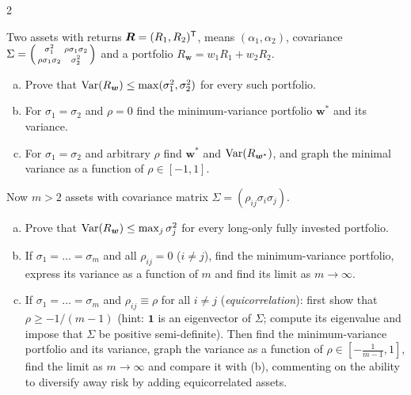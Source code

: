 \begin{paracol}{2}
\begin{exercise}\label{ch10:ex-ps6-3}
Two assets with returns $\bm R=(R_1,R_2)^{\mathsf T}$, means $(\alpha_1,\alpha_2)$, covariance
$\Sigma=\begin{psmallmatrix}\sigma_1^2&\rho\sigma_1\sigma_2\\ \rho\sigma_1\sigma_2&\sigma_2^2\end{psmallmatrix}$ and a portfolio
$R_{\bm w}=w_1R_1+w_2R_2$.
\begin{enumerate}[(a)]
  \item Prove that $\operatorname{Var}(R_{\bm w})\le\max(\sigma_1^2,\sigma_2^2)$ for every such portfolio.
  \item For $\sigma_1=\sigma_2$ and $\rho=0$ find the minimum-variance portfolio $\bm w^*$ and its variance.
  \item For $\sigma_1=\sigma_2$ and arbitrary $\rho$ find $\bm w^*$ and $\operatorname{Var}(R_{\bm w^*})$, and graph the minimal variance as a function of
      $\rho\in[-1,1]$.
\end{enumerate}
\end{exercise}

\begin{exercise}\label{ch10:ex-ps6-4}
Now $m>2$ assets with covariance matrix $\Sigma=(\rho_{ij}\sigma_i\sigma_j)$.
\begin{enumerate}[(a)]
  \item Prove that $\operatorname{Var}(R_{\bm w})\le\max_j\sigma_j^2$ for every long-only fully invested portfolio.
  \item If $\sigma_1=\dots=\sigma_m$ and all $\rho_{ij}=0$ ($i\neq j$), find the minimum-variance portfolio, express its variance as a function
      of $m$ and find its limit as $m\to\infty$.
  \item If $\sigma_1=\dots=\sigma_m$ and $\rho_{ij}\equiv\rho$ for all $i\neq j$ (\emph{equicorrelation}): first show that
      $\rho\ge-1/(m-1)$ (hint: $\bm 1$ is an eigenvector of $\Sigma$; compute its eigenvalue and impose that $\Sigma$ be positive
      semi-definite). Then find the minimum-variance portfolio and its variance, graph the variance as a function of $\rho\in[-\frac1{m-1},1]$,
      find the limit as $m\to\infty$ and compare it with (b), commenting on the ability to diversify away risk by adding equicorrelated assets.
\end{enumerate}
\end{exercise}


\end{paracol}
